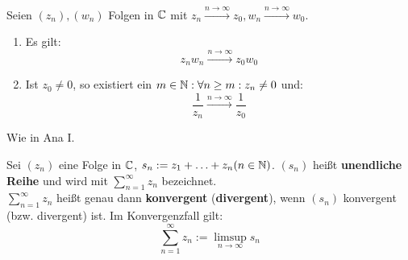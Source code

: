 \documentclass[a4paper,twoside,DIV15,BCOR12mm,chapterprefix=true,headings=twolinechapter]{scrbook}
\begin{document}
\begin{satz}
Seien $(z_n),(w_n)$ Folgen in $\mathbb{C}$ mit $z_n\stackrel{n\to\infty}{\to}z_0,
w_n\stackrel{n\to\infty}{\to}w_0$.
\begin{enumerate}
\item Es gilt:
\[z_nw_n\stackrel{n\to\infty}{\to}z_0w_0\]
\item Ist $z_0\ne 0$, so existiert ein $m\in\mathbb{N}:\forall n\ge m:z_n\ne 0$ und:
\[\frac1{z_n}\stackrel{n\to\infty}{\to}\frac1{z_0}\]
\end{enumerate}
\end{satz}

\begin{beweis}
Wie in Ana I.
\end{beweis}

\begin{definition}
Sei $(z_n)$ eine Folge in $\mathbb{C}$, $s_n:=z_1+\ldots+z_n (n\in\mathbb{N})$. $(s_n)$ heißt
\textbf{unendliche Reihe} und wird mit $\sum_{n=1}^{\infty} z_n$ bezeichnet.\\
$\sum_{n=1}^{\infty} z_n$ heißt genau dann \textbf{konvergent} (\textbf{divergent}),
wenn $(s_n)$ konvergent (bzw. divergent) ist. Im Konvergenzfall gilt:
\[\sum_{n=1}^{\infty} z_n:=\limsup_{n\to\infty} s_n\]
\end{definition}
\end{document}
